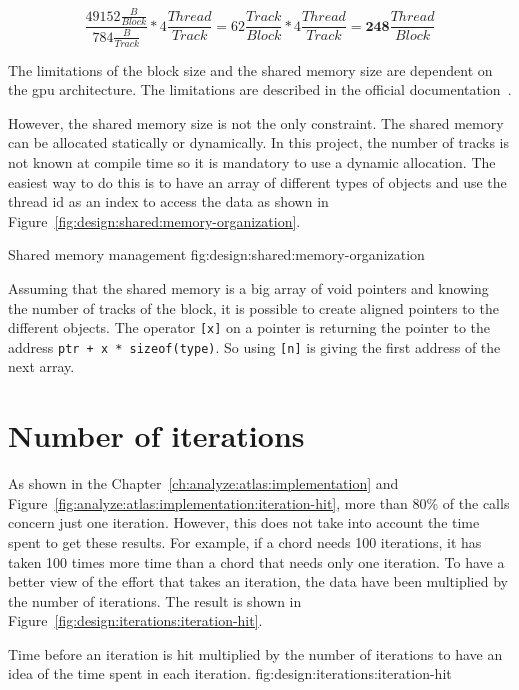 \begin{equation}
    \frac{49152\frac{B}{Block} }{784 \frac{B}{Track} } * 4 \frac{Thread}{Track} = 62\frac{Track}{Block} * 4 \frac{Thread}{Track} = \textbf{248}\frac{Thread}{Block}
    \label{eq:design:shared:dimension-with-coef}
\end{equation}

The limitations of the block size and the shared memory size are dependent on
the \acrshort{gpu} architecture.
The limitations are described in the official documentation~\cite{cuda-capability}.

However, the shared memory size is not the only constraint.
The shared memory can be allocated statically or dynamically.
In this project, the number of tracks is not known at compile time so it is
mandatory to use a dynamic allocation.
The easiest way to do this is to have an array of different types of objects and
use the thread id as an index to access the data as shown in Figure~\ref{fig:design:shared:memory-organization}.

        {Shared memory management}
        {fig:design:shared:memory-organization}

Assuming that the shared memory is a big array of void pointers and knowing the
number of tracks of the block, it is possible to create aligned pointers to the
different objects.
The operator \texttt{[x]} on a pointer is returning the pointer to the address
\texttt{ptr + x * sizeof(type)}. So using \texttt{[n]} is giving the first
address of the next array.


\section{Number of iterations}
\label{ch:design:iterations}

As shown in the Chapter~\ref{ch:analyze:atlas:implementation} and Figure~\ref{fig:analyze:atlas:implementation:iteration-hit},
more than 80\% of the calls concern just one iteration.
However, this does not take into account the time spent to get these results.
For example, if a chord needs 100 iterations, it has taken 100 times more time
than a chord that needs only one iteration.
To have a better view of the effort that takes an iteration, the data have been
multiplied by the number of iterations.
The result is shown in Figure~\ref{fig:design:iterations:iteration-hit}.

        {Time before an iteration is hit multiplied by the number of iterations to
        have an idea of the time spent in each iteration.}
        {fig:design:iterations:iteration-hit}

